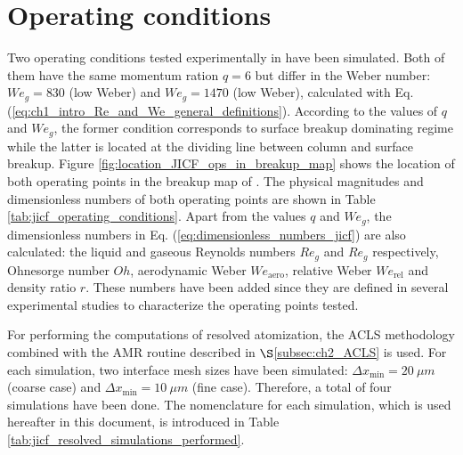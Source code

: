 \section{Operating conditions}

Two operating conditions tested experimentally in  have been simulated. Both of them have the same momentum ration $q = 6$ but differ in the Weber number: $We_g = 830$ (low Weber) and $We_g = 1470$ (low Weber), calculated with Eq. (\ref{eq:ch1_intro_Re_and_We_general_definitions}). According to the values of $q$ and $We_g$, the former condition corresponds to surface breakup dominating regime while the latter is located at the dividing line between column and surface breakup. Figure \ref{fig:location_JICF_ops_in_breakup_map} shows the location of both operating points in the breakup map of \citeColor[wu_breakup_1997]. The physical magnitudes and dimensionless numbers of both operating points are shown in Table \ref{tab:jicf_operating_conditions}. Apart from the values $q$ and $We_g$, the dimensionless numbers in  Eq. (\ref{eq:dimensionless_numbers_jicf}) are also calculated: the liquid and gaseous Reynolds numbers $Re_g$ and $Re_g$ respectively, Ohnesorge number $Oh$, aerodynamic Weber $We_\mathrm{aero}$, relative Weber $We_\mathrm{rel}$ and density ratio $r$. These numbers have been added since they are defined in several experimental studies  to characterize the operating points tested. 

For performing the computations of resolved atomization, the ACLS methodology combined with the AMR routine described in $\S$\ref{subsec:ch2_ACLS} is used. For each simulation, two interface mesh sizes have been simulated: $\Delta x_\mathrm{min} = 20 ~\mu m$ (coarse case) and $\Delta x_\mathrm{min} = 10 ~\mu m$ (fine case). Therefore, a total of four simulations have been done. The nomenclature for each simulation, which is used hereafter in this document, is introduced in Table \ref{tab:jicf_resolved_simulations_performed}.


